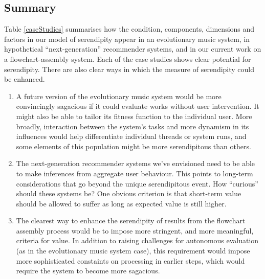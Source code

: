 \subsection{Summary}

Table \ref{caseStudies} summarises how the condition, components,
dimensions and factors in our model of serendipity appear in an
evolutionary music system, in hypothetical ``next-generation''
recommender systems, and in our current work on a flowchart-assembly
system.  Each of the case studies shows clear potential for
serendipity.  There are also clear ways in which the measure of
serendipity could be enhanced.

\begin{enumerate}
\item A future version of the evolutionary music system would be more
  convincingly sagacious if it could evaluate works without user
  intervention.  It might also be able to tailor its fitness function
  to the individual user.  More broadly, interaction between the
  system's tasks and more dynamism in its influences would help
  differentiate individual threads or system runs, and some elements
  of this population might be more serendipitous than others.

\item The next-generation recommender systems we've envisioned need to
  be able to make inferences from aggregate user behaviour.  This
  points to long-term considerations that go beyond the unique
  serendipitous event.  How ``curious'' should these systems be?  One
  obvious criterion is that short-term value should be allowed to
  suffer as long as expected value is still higher.

\item The clearest way to enhance the serendipity of results from the
  flowchart assembly process would be to impose more stringent, and
  more meaningful, criteria for value.  In addition to raising
  challenges for autonomous evaluation (as in the evolutionary music
  system case), this requirement would impose more sophisticated
  constaints on processing in earlier steps, which would require the
  system to become more sagacious.
\end{enumerate}

